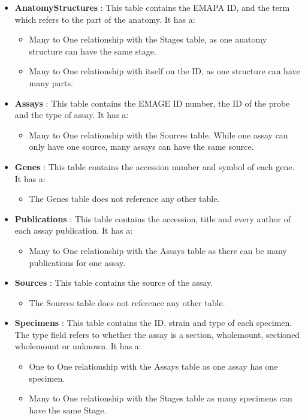 \begin{itemize}
\item \textbf{AnatomyStructures} : This table contains the EMAPA ID, and the term which refers to the part of the anatomy. It has a:
\begin{itemize}
\item Many to One relationship with the Stages table, as one anatomy structure can have the same stage.
\item Many to One relationship with itself on the ID, as one structure can have many parts.
\end{itemize} 

\item \textbf{Assays} : This table contains the EMAGE ID number, the ID of the probe and the type of assay. It has a:
\begin{itemize}
\item Many to One relationship with the Sources table. While one assay can only have one source, many assays can have the same source.
\end{itemize} 

\item \textbf{Genes} : This table contains the accession number and symbol of each gene. It has a:
\begin{itemize}
\item The Genes table does not reference any other table.
\end{itemize} 

\item \textbf{Publications} : This table contains the accession, title and every author of each assay publication. It has a:
\begin{itemize}
\item Many to One relationship with the Assays table as there can be many publications for one assay.
\end{itemize} 

\item \textbf{Sources} : This table contains the source of the assay.
\begin{itemize}
\item The Sources table does not reference any other table.
\end{itemize} 

\item \textbf{Specimens} :  This table contains the ID, strain and type of each specimen. The type field refers to whether the assay is a section, wholemount, sectioned wholemount or unknown. It has a:
\begin{itemize}
\item One to One relationship with the Assays table as one assay has one specimen.
\item Many to One relationship with the Stages table as many specimens can have the same Stage.
\end{itemize} 


\end{itemize}
